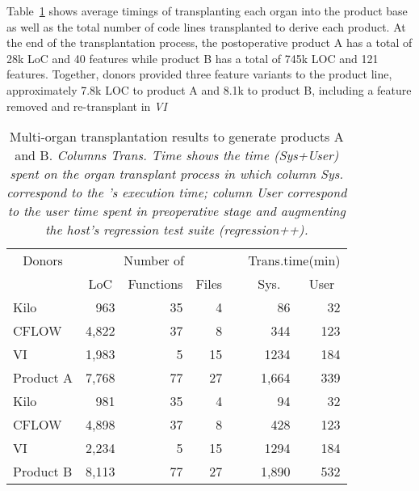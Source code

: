 Table~\ref{tab:transplantation_time} shows average timings of transplanting each organ into the product base as well as the total number of code lines transplanted to derive each product. At the end of the transplantation process, the postoperative product A has a total of 28k LoC and 40 features while product B has a total of 745k LOC and 121 features. Together, donors provided three feature variants to the product line, approximately 7.8k LOC to product A and 8.1k to product B, including a feature removed and re-transplant in \emph{VI}

\begin{table}[t]\centering \small

    \caption{Multi-organ transplantation results to generate products A and B. \emph{Columns Trans. Time shows the time (Sys+User) spent on the organ transplant process in which column Sys. correspond to the \autoscalpel's execution time; column User correspond to the user time spent in preoperative stage and  augmenting the host’s regression test suite (regression++).}}
    \label{tab:transplantation_time}
	\begin{center}
	\begin{tabular}{lrrrrrr} \hline
		\multicolumn{1}{c}{Donors} & \multicolumn{3}{c}{Number of}   & &\multicolumn{2}{c}{Trans.time(min)} \\
		\cline{2-4} \cline{6-7}
		 & \multicolumn{1}{c}{LoC}  & \multicolumn{1}{c}{Functions} & \multicolumn{1}{c}{Files} & & \multicolumn{1}{c}{Sys.} & \multicolumn{1}{c}{User}\\\hline
		Kilo        & 963 & 35 & 4 & & 86 & 32\\
		CFLOW       & 4,822 & 37 & 8 &  & 344 &123 \\
		VI          & 1,983 & 5 & 15 &  & 1234 &184\\\hline
		\rowcolor[gray]{.9} Product A  &7,768 & 77 & 27 & & 1,664 & 339 \\\hline
		Kilo        & 981 & 35 & 4 & & 94 & 32\\
		CFLOW       & 4,898 & 37 & 8 &  & 428 & 123\\
		VI          & 2,234 & 5 & 15 &  & 1294 & 184\\\hline
		\rowcolor[gray]{.9} Product B  & 8,113 & 77 & 27 & & 1,890 &532\\\hline
	\end{tabular}
	\end{center}
	
\end{table}

